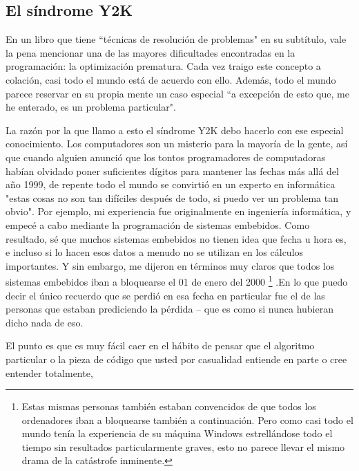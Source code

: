 \newpage

\subsection*{El síndrome Y2K}
\label{sec:y2k}

En un libro que tiene “técnicas de resolución de problemas" en su subtítulo, vale la pena mencionar una de las mayores dificultades encontradas en la programación: la optimización prematura. Cada vez traigo este concepto a colación, casi todo el mundo está de acuerdo con ello. Además, todo el mundo parece reservar en su propia mente un caso especial  “a excepción de esto que, me he enterado, es un problema particular". \newline

La razón por la que llamo a esto el síndrome Y2K debo hacerlo con ese especial conocimiento. Los computadores son un misterio para la mayoría de la gente, así que cuando alguien anunció que los tontos programadores de computadoras  habían olvidado poner suficientes dígitos para mantener las fechas más allá del año 1999, de repente todo el mundo se convirtió en un experto en informática \- "estas cosas no son tan difíciles después de todo, si puedo ver un problema tan obvio". Por ejemplo, mi experiencia fue originalmente en ingeniería informática, y empecé a cabo mediante la programación de sistemas embebidos. Como resultado, sé que muchos sistemas embebidos no tienen idea que fecha u hora es, e incluso si lo hacen esos datos a menudo no se utilizan en los cálculos importantes. Y sin embargo, me dijeron en términos muy claros que todos los sistemas embebidos iban a bloquearse el 01 de enero del 2000 \footnote{Estas mismas personas también estaban convencidos de que todos los ordenadores iban a bloquearse también a continuación. Pero como casi todo el mundo tenía la experiencia de su máquina Windows estrellándose todo el tiempo sin resultados particularmente graves, esto no parece llevar el mismo drama de la catástrofe inminente.} %
.En lo que puedo decir el único recuerdo que se perdió en esa fecha en particular fue el de las personas que estaban prediciendo la pérdida –  que es como si nunca hubieran dicho nada de eso.
\newline

El punto es que es muy fácil caer en el hábito de pensar que el algoritmo particular o la pieza de código que usted por casualidad entiende en parte o cree entender totalmente, %

